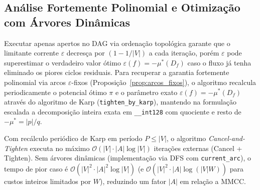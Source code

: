 \subsection{Análise Fortemente Polinomial e Otimização com Árvores Dinâmicas}

Executar apenas apertos no DAG via ordenação topológica garante que o limitante corrente $\varepsilon$ decresça por $(1 - 1/|V|)$ a cada iteração, porém $\varepsilon$ pode superestimar o verdadeiro valor ótimo $\varepsilon(f) = -\mu^*(D_f)$ caso o fluxo já tenha eliminado os piores ciclos residuais. Para recuperar a garantia fortemente polinomial via arcos $\varepsilon$-fixos (Proposição~\ref{prop:arcos_fixos}), o algoritmo recalcula periodicamente o potencial ótimo $\pi$ e o parâmetro exato $\varepsilon(f) = -\mu^*(D_f)$ através do algoritmo de Karp (\lstinline{tighten_by_karp}), mantendo na formulação escalada a decomposição inteira exata em \lstinline{__int128} com quociente e resto de $-\mu^* = |p|/q$.

\begin{teorema}
Com recálculo periódico de Karp em período $P \le |V|$, o algoritmo \textit{Cancel-and-Tighten} executa no máximo $\mathcal{O}(|V| \cdot |A| \log |V|)$ iterações externas \textnormal{(Cancel + Tighten)}. Sem árvores dinâmicas (implementação via DFS com \lstinline{current_arc}), o tempo de pior caso é $\mathcal{O}(|V|^2 \cdot |A|^2 \log |V|)$ (e $\mathcal{O}(|V|^2 \cdot |A| \log(|V|W))$ para custos inteiros limitados por $W$), reduzindo um fator $|A|$ em relação a MMCC.
\end{teorema}

